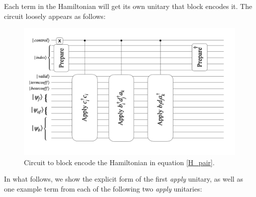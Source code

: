 Each term in the Hamiltonian will get its own unitary that block encodes it. The circuit loosely appears as follows:

\begin{figure}[h]
    \includegraphics[width = \linewidth]{figures/H_example_LOBE_circuit.png}
    \caption{Circuit to block encode the Hamiltonian in equation \ref{H_pair}. }
\end{figure}

In what follows, we show the explicit form of the first \textit{apply} unitary, as well as one example term from each of the following two \textit{apply} unitaries:

